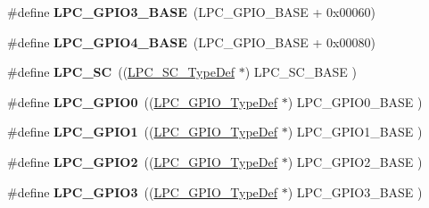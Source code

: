 \begin{DoxyCompactItemize}
\item 
\hypertarget{group___l_p_c17xx___system_ga56c68c5326b521b3278a35f4d81369a9}{\#define {\bfseries \-L\-P\-C\-\_\-\-G\-P\-I\-O3\-\_\-\-B\-A\-S\-E}~(\-L\-P\-C\-\_\-\-G\-P\-I\-O\-\_\-\-B\-A\-S\-E + 0x00060)}\label{group___l_p_c17xx___system_ga56c68c5326b521b3278a35f4d81369a9}

\item 
\hypertarget{group___l_p_c17xx___system_gaa54352e7745932e78b56bcbc1d70fa21}{\#define {\bfseries \-L\-P\-C\-\_\-\-G\-P\-I\-O4\-\_\-\-B\-A\-S\-E}~(\-L\-P\-C\-\_\-\-G\-P\-I\-O\-\_\-\-B\-A\-S\-E + 0x00080)}\label{group___l_p_c17xx___system_gaa54352e7745932e78b56bcbc1d70fa21}

\item 
\hypertarget{group___l_p_c17xx___system_gac01c7f61bb84ad209eec22ec5c05446d}{\#define {\bfseries \-L\-P\-C\-\_\-\-S\-C}~((\hyperlink{struct_l_p_c___s_c___type_def}{\-L\-P\-C\-\_\-\-S\-C\-\_\-\-Type\-Def}        $\ast$) \-L\-P\-C\-\_\-\-S\-C\-\_\-\-B\-A\-S\-E       )}\label{group___l_p_c17xx___system_gac01c7f61bb84ad209eec22ec5c05446d}

\item 
\hypertarget{group___l_p_c17xx___system_ga92f3de6ff5cfd5b8c290696fad07b18a}{\#define {\bfseries \-L\-P\-C\-\_\-\-G\-P\-I\-O0}~((\hyperlink{struct_l_p_c___g_p_i_o___type_def}{\-L\-P\-C\-\_\-\-G\-P\-I\-O\-\_\-\-Type\-Def}      $\ast$) \-L\-P\-C\-\_\-\-G\-P\-I\-O0\-\_\-\-B\-A\-S\-E    )}\label{group___l_p_c17xx___system_ga92f3de6ff5cfd5b8c290696fad07b18a}

\item 
\hypertarget{group___l_p_c17xx___system_ga335587dad4e6d0da56c1f3ad1c087d10}{\#define {\bfseries \-L\-P\-C\-\_\-\-G\-P\-I\-O1}~((\hyperlink{struct_l_p_c___g_p_i_o___type_def}{\-L\-P\-C\-\_\-\-G\-P\-I\-O\-\_\-\-Type\-Def}      $\ast$) \-L\-P\-C\-\_\-\-G\-P\-I\-O1\-\_\-\-B\-A\-S\-E    )}\label{group___l_p_c17xx___system_ga335587dad4e6d0da56c1f3ad1c087d10}

\item 
\hypertarget{group___l_p_c17xx___system_ga27a09e8c08f9e209c6af70b0a3c56b39}{\#define {\bfseries \-L\-P\-C\-\_\-\-G\-P\-I\-O2}~((\hyperlink{struct_l_p_c___g_p_i_o___type_def}{\-L\-P\-C\-\_\-\-G\-P\-I\-O\-\_\-\-Type\-Def}      $\ast$) \-L\-P\-C\-\_\-\-G\-P\-I\-O2\-\_\-\-B\-A\-S\-E    )}\label{group___l_p_c17xx___system_ga27a09e8c08f9e209c6af70b0a3c56b39}

\item 
\hypertarget{group___l_p_c17xx___system_ga6e961eb01d0f1e61dd9b9d5979d2aafc}{\#define {\bfseries \-L\-P\-C\-\_\-\-G\-P\-I\-O3}~((\hyperlink{struct_l_p_c___g_p_i_o___type_def}{\-L\-P\-C\-\_\-\-G\-P\-I\-O\-\_\-\-Type\-Def}      $\ast$) \-L\-P\-C\-\_\-\-G\-P\-I\-O3\-\_\-\-B\-A\-S\-E    )}\label{group___l_p_c17xx___system_ga6e961eb01d0f1e61dd9b9d5979d2aafc}


\end{DoxyCompactItemize}
